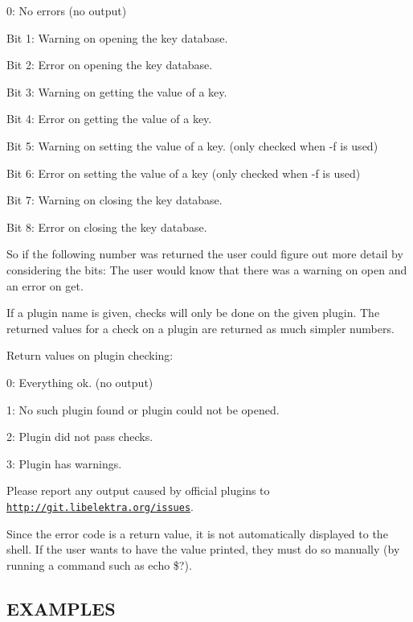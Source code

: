 \begin{DoxyItemize}
\item 0\+: No errors (no output)
\item Bit 1\+: Warning on opening the key database.
\item Bit 2\+: Error on opening the key database.
\item Bit 3\+: Warning on getting the value of a key.
\item Bit 4\+: Error on getting the value of a key.
\item Bit 5\+: Warning on setting the value of a key. (only checked when {\ttfamily -\/f} is used)
\item Bit 6\+: Error on setting the value of a key (only checked when {\ttfamily -\/f} is used)
\item Bit 7\+: Warning on closing the key database.
\item Bit 8\+: Error on closing the key database.
\end{DoxyItemize}

So if the following number was returned {} the user could figure out more detail by considering the bits\+: {} The user would know that there was a warning on open and an error on get.

If a plugin name is given, checks will only be done on the given plugin. The returned values for a check on a plugin are returned as much simpler numbers.

Return values on plugin checking\+:


\begin{DoxyItemize}
\item 0\+: Everything ok. (no output)
\item 1\+: No such plugin found or plugin could not be opened.
\item 2\+: Plugin did not pass checks.
\item 3\+: Plugin has warnings.
\end{DoxyItemize}

Please report any output caused by official plugins to \href{http://git.libelektra.org/issues}{\tt http\+://git.\+libelektra.\+org/issues}.

Since the error code is a return value, it is not automatically displayed to the shell. If the user wants to have the value printed, they must do so manually (by running a command such as {\ttfamily echo \$?}).

\subsection*{E\+X\+A\+M\+P\+L\+E\+S}

